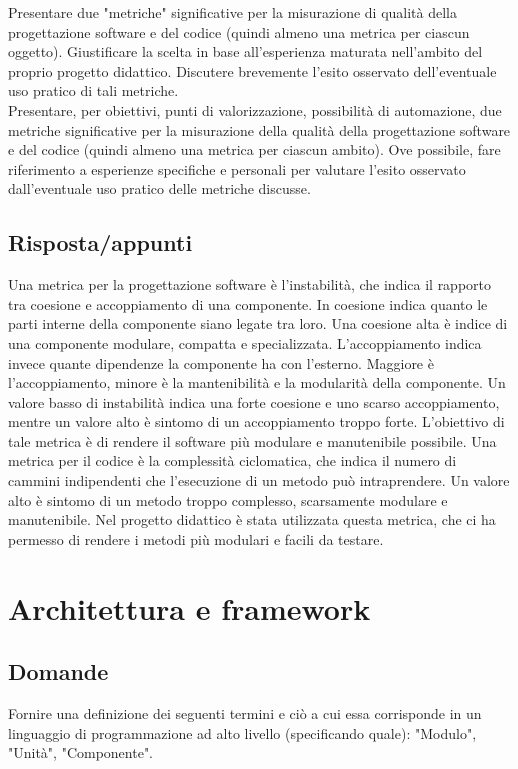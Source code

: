 Presentare due "metriche" significative per la misurazione di qualità della progettazione software e del codice (quindi almeno una metrica per ciascun oggetto). 
Giustificare la scelta in base all'esperienza maturata nell'ambito del proprio progetto didattico.
Discutere brevemente l'esito osservato dell'eventuale uso pratico di tali metriche.\\

Presentare, per obiettivi, punti di valorizzazione, possibilità di automazione, due metriche significative per la misurazione della qualità della progettazione software e del codice (quindi almeno una metrica per ciascun ambito).
Ove possibile, fare riferimento a esperienze specifiche e personali per valutare l'esito osservato dall'eventuale uso pratico delle metriche discusse. 

\subsection*{Risposta/appunti}
Una metrica per la progettazione software è l'instabilità, che indica il rapporto tra coesione e accoppiamento di una
componente. In coesione indica quanto le parti interne della componente siano legate tra loro. Una coesione alta è
indice di una componente modulare, compatta e specializzata. L'accoppiamento indica invece quante dipendenze la
componente ha con l'esterno. Maggiore è l'accoppiamento, minore è la mantenibilità e la modularità della componente.
Un valore basso di instabilità indica una forte coesione e uno scarso accoppiamento, mentre un valore alto è sintomo di
un accoppiamento troppo forte. L'obiettivo di tale metrica è di rendere il software più modulare e manutenibile
possibile. Una metrica per il codice è la complessità ciclomatica, che indica il numero di cammini indipendenti che
l'esecuzione di un metodo può intraprendere. Un valore alto è sintomo di un metodo troppo complesso, scarsamente
modulare e manutenibile. Nel progetto didattico è stata utilizzata questa metrica, che ci ha permesso di rendere i metodi
più modulari e facili da testare.

\section{Architettura e framework}

\subsection*{Domande}
Fornire una definizione dei seguenti termini e ciò a cui essa corrisponde in un linguaggio di programmazione ad alto livello (specificando quale): "Modulo", "Unità", "Componente".

